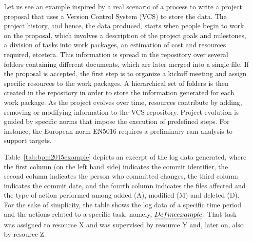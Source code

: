 
Let us see an example inspired by a real scenario of a process to write a project proposal that uses a Version Control System (VCS) to store the data. The project history, and hence, the data produced, starts when people begin to work on the proposal, which involves a description of the project goals and milestones, a division of tasks into work packages, an estimation of cost and resources required, etcetera. This information is spread in the repository over several folders containing different documents, which are later merged into a single file. If the proposal is accepted, the first step is to organize a kickoff meeting and assign specific resources to the work packages. A hierarchical set of folders is then created in the repository in order to store the information generated for each work package. As the project evolves over time, resources contribute by adding, removing or modifying information to the VCS repository. %
Project evolution is guided by specific norms that impose the execution of predefined steps. For instance, the European norm EN5016 requires a preliminary \gls{ram} analysis to support targets. 

Table~\ref{tab:bpm2015example} depicts an excerpt of the log data generated, where the first column (on the left hand side) indicates the commit identifier, the second column indicates the person who committed changes, the third column indicates the commit date, %
and the fourth column indicates the files affected and the type of action performed among added (A), modified (M) and deleted (D).
For the sake of simplicity, the table shows the log data of a specific time period and the actions related to a specific task, namely, $\emph{Define example}$. That task was assigned to resource X %
and was supervised by resource Y and, later on, also by resource Z.

